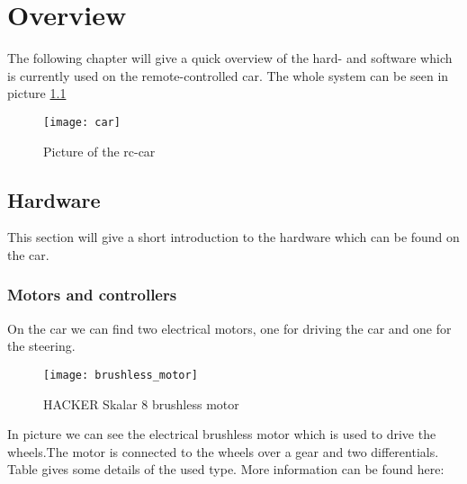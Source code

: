 %
%

\newcommand{\makro}[1]{\texttt{\textbackslash{}#1\{\}}}

\chapter{Overview}
\label{sec:overview}

The following chapter will give a quick overview of the hard- and software which is currently used on the remote-controlled car. The whole system can be seen in picture \ref{fig:rccar_overview}

\begin{figure}[h]
	\centering
		\texttt{[image: car]}
	\caption{Picture of the rc-car}
	\label{fig:rccar_overview}
\end{figure}


\newpage
\section{Hardware}
\label{sec:overview_hardware}

This section will give a short introduction to the hardware which can be found on the car.

\subsection{Motors and controllers}
\label{sec:overview_motors}

On the car we can find two electrical motors, one for driving the car and one for the steering. 

\begin{figure}[h]
	\centering
		\texttt{[image: brushless\_motor]}
	\caption{HACKER Skalar 8 brushless motor}
	\label{fig:brushless_motor}
\end{figure}


In picture  we can see the electrical brushless motor which is used to drive the wheels.The motor is connected to the wheels over a gear and two differentials. Table  gives some details of the used type. More information can be found here:

